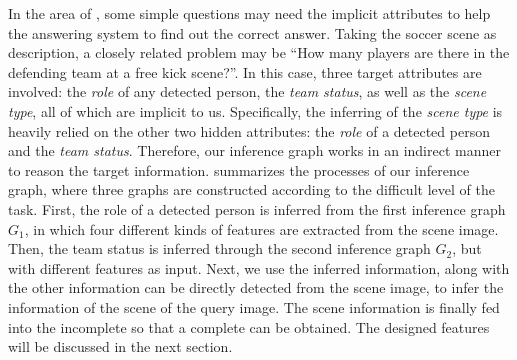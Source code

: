 In the area of \vqa, some simple questions may need the implicit attributes to help the answering system to find out the correct answer. 
Taking the soccer scene as description,
a closely related problem may be ``How many players are there in the defending team at a free kick scene?''. 
In this case, three target attributes are involved: the \emph{role} of any detected person, the \emph{team status}, as well as the \emph{scene type}, all of which are implicit to us. 
Specifically, the inferring of the \emph{scene type} is heavily relied on the other two hidden attributes: the \emph{role} of a detected person and the \emph{team status}. 
Therefore, our inference graph works in an indirect manner to reason the target information.
 summarizes the processes of our inference graph, where three graphs are constructed according to the difficult level of the task. First, the role of a detected person is inferred from the first inference graph $G_1$, in which four different kinds of features are extracted from the scene image. Then, the team status is inferred through the second inference graph $G_2$, but with different features as input. Next, we use the inferred information, along with the other information can be directly detected from the scene image, to infer the information of the scene of the query image.
The scene information is finally fed into the incomplete  so that a complete  can be obtained. 
The designed features will be discussed in the next section.  
